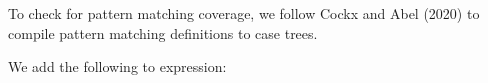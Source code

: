 To check for pattern matching coverage, we follow Cockx and Abel (2020) to compile pattern matching definitions to case trees.

We add the following to expression:

